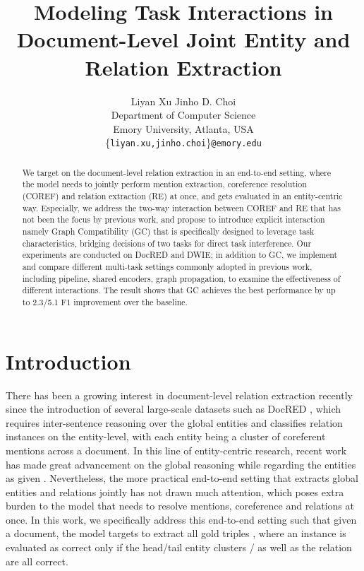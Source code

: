 \documentclass[11pt]{article}
\title{Modeling Task Interactions in\\ Document-Level Joint Entity and Relation Extraction}
\author{
  Liyan Xu \quad\quad Jinho D. Choi \\
  Department of Computer Science \\
  Emory University, Atlanta, USA \\ \{\texttt{liyan.xu,jinho.choi}\}\texttt{@emory.edu}}
\begin{document}
\maketitle

\begin{abstract}
We target on the document-level relation extraction in an end-to-end setting, where the model needs to jointly perform mention extraction, coreference resolution (COREF) and relation extraction (RE) at once, and gets evaluated in an entity-centric way. Especially, we address the two-way interaction between COREF and RE that has not been the focus by previous work, and propose to introduce explicit interaction namely Graph Compatibility (GC) that is specifically designed to leverage task characteristics, bridging decisions of two tasks for direct task interference.
Our experiments are conducted on DocRED and DWIE; in addition to GC, we implement and compare different multi-task settings commonly adopted in previous work, including pipeline, shared encoders, graph propagation, to examine the effectiveness of different interactions.
The result shows that GC achieves the best performance by up to 2.3/5.1 F1 improvement over the baseline.
\end{abstract} \section{Introduction}
\label{sec:intro}

There has been a growing interest in document-level relation extraction recently since the introduction of several large-scale datasets such as DocRED \citep{docred}, which requires inter-sentence reasoning over the global entities and classifies relation instances on the entity-level, with each entity being a cluster of coreferent mentions across a document.
In this line of entity-centric research, recent work has made great advancement on the global reasoning while regarding the entities as given \citep{nan-etal-2020-reasoning,atlop,ssan,learning-logic}.
Nevertheless, the more practical end-to-end setting that extracts global entities and relations jointly has not drawn much attention, which poses extra burden to the model that needs to resolve mentions, coreference and relations at once.
In this work, we specifically address this end-to-end setting such that given a document, the model targets to extract all gold triples , where an instance is evaluated as correct only if the head/tail entity clusters / as well as the relation  are all correct.
\end{document}
